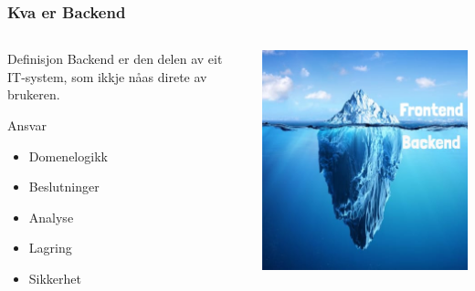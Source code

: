 \documentclass{beamer}
\begin{document}
    \begin{frame}
        \frametitle{Kva er Backend}
        \begin{columns}[c]
            \begin{column}{.55\textwidth}
                \begin{block}{Definisjon}
                    Backend er den delen av eit IT-system,
                    som ikkje nåas direte av brukeren.
                \end{block}
                \begin{block}{Ansvar}
                    \begin{itemize}
                        \item Domenelogikk
                        \item Beslutninger
                        \item Analyse
                        \item Lagring
                        \item Sikkerhet
                    \end{itemize}
                \end{block}
            \end{column}
            \begin{column}{.45\textwidth}
                \begin{center}
                    \includegraphics[width=\textwidth]{images/backend-iceberg}
                \end{center}
            \end{column}
        \end{columns}
    \end{frame}
\end{document}
